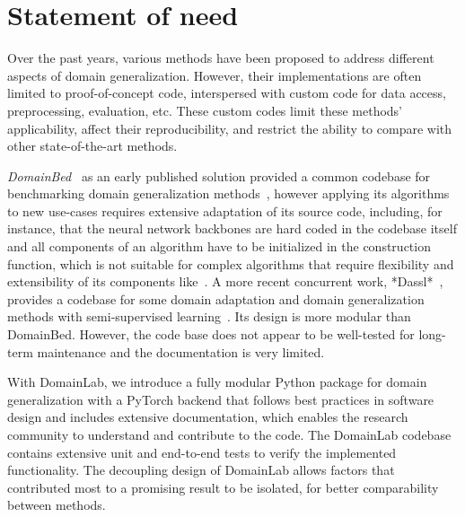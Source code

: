 \section{Statement of need}\label{statement-of-need}
Over the past years, various methods have been proposed to address
different aspects of domain generalization. However, their
implementations are often limited to proof-of-concept code, interspersed
with custom code for data access, preprocessing, evaluation, etc. These
custom codes limit these methods' applicability, affect their
reproducibility, and restrict the ability to compare with other
state-of-the-art methods.

\emph{DomainBed}~\cite{domainbed2022github} as an early published solution provided a common codebase for benchmarking domain generalization methods~\cite{gulrajani2020search}, however applying its algorithms to new use-cases requires extensive adaptation of its source code, including, for instance, that the neural network backbones are hard coded in the codebase itself and all components of an algorithm have to be initialized in the construction function, which is not suitable for complex algorithms that require flexibility and extensibility of its components like~\cite{mahajan2021domain, sun2021hierarchical}.
A more recent concurrent work, *Dassl*~\cite{dassl2022github}, provides a codebase for some domain adaptation and domain generalization methods with semi-supervised learning~\cite{zhou2021domain}.
Its design is more modular than DomainBed. However, the code base does
not appear to be well-tested for long-term maintenance and the
documentation is very limited.

With DomainLab, we introduce a fully modular Python package for domain
generalization with a PyTorch backend that follows best practices in
software design and includes extensive documentation, which enables the
research community to understand and contribute to the code. The
DomainLab codebase contains extensive unit and end-to-end tests to
verify the implemented functionality. The decoupling design of DomainLab
allows factors that contributed most to a promising result to be
isolated, for better comparability between methods.
